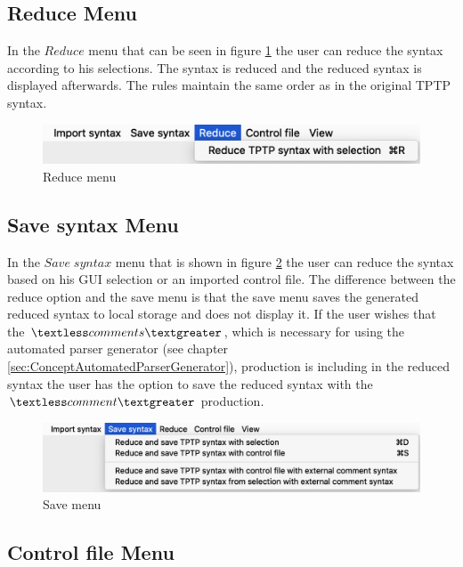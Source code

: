 \subsection{Reduce Menu}\label{sec:ConceptGUIReduceMenu}

In the $Reduce$ menu that can be seen in figure \ref{fig:reduce} the user can reduce the syntax according to his selections. The syntax is reduced and the reduced syntax is displayed afterwards. The rules maintain the same order as in the original \ac{TPTP} syntax.

\begin{figure}[H]
\centering
\includegraphics[width=.7\textwidth]{images/reduce.png}
\caption{Reduce menu}
\label{fig:reduce}
\end{figure}

\subsection{Save syntax Menu}\label{sec:ConceptGUISaveSyntaxMenu}

In the $Save\;syntax$ menu that is shown in figure \ref{fig:save} the user can reduce the syntax based on his GUI selection or an imported control file. The difference between the reduce option and the save menu is that the save menu saves the generated reduced syntax to local storage and does not display it. If the user wishes that the $\textless comments\textgreater$, which is necessary for using the automated parser generator (see chapter \ref{sec:ConceptAutomatedParserGenerator}), production is including in the reduced syntax the user has the option to save the reduced syntax with the $\textless comment\textgreater$ production.

\begin{figure}[H]
\centering
\includegraphics[width=.7\textwidth]{images/save.png}
\caption{Save menu}
\label{fig:save}
\end{figure}

\subsection{Control file Menu}\label{sec:ConceptGUIControlFileMenu}

